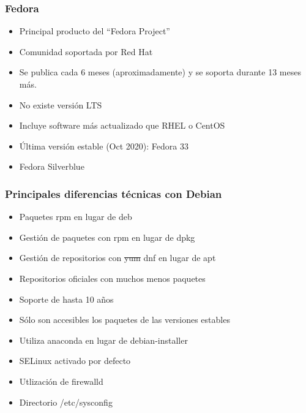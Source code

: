 \documentclass{beamer}
\begin{document}
\begin{frame}
  \frametitle{Fedora}
  \begin{itemize}
  \item Principal producto del ``Fedora Project''
  \item Comunidad soportada por Red Hat
  \item Se publica cada 6 meses (aproximadamente) y se soporta durante 13 meses más.
  \item No existe versión LTS
  \item Incluye software más actualizado que RHEL o CentOS
  \item Última versión estable (Oct 2020): Fedora 33
  \item Fedora Silverblue
  \end{itemize}
\end{frame}

\begin{frame}
  \frametitle{Principales diferencias técnicas con Debian}
  \begin{itemize}
  \item Paquetes rpm en lugar de deb
  \item Gestión de paquetes con rpm en lugar de dpkg
  \item Gestión de repositorios con \sout{yum} dnf en lugar de apt
  \item Repositorios oficiales con muchos menos paquetes
  \item Soporte de hasta 10 años
  \item Sólo son accesibles los paquetes de las versiones estables
  \item Utiliza anaconda en lugar de debian-installer
  \item SELinux activado por defecto
  \item Utlización de firewalld 
  \item Directorio /etc/sysconfig
  \end{itemize}
\end{frame}
\end{document}
